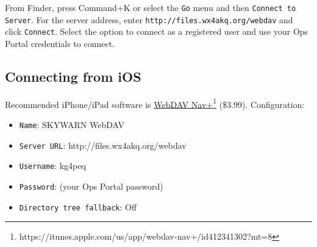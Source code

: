 \documentclass[pdflatex,letterpaper,twoside,12pt]{book}
\begin{document}
From Finder, press Command+K or select the \texttt{Go} menu and then \texttt{Connect to Server}.  For the server address, enter \texttt{http://files.wx4akq.org/webdav} and click \texttt{Connect}.  Select the option to connect as a registered user and use your Ops Portal credentials to connect.

\subsection{Connecting from iOS}

Recommended iPhone/iPad software is \href{https://itunes.apple.com/us/app/webdav-nav+/id412341302?mt=8}{WebDAV Nav+}\footnote{https://itunes.apple.com/us/app/webdav-nav+/id412341302?mt=8} (\$3.99). Configuration:

\begin{itemize}
\item \texttt{Name}: SKYWARN WebDAV
\item \texttt{Server URL}: http://files.wx4akq.org/webdav
\item \texttt{Username}: kg4peq
\item \texttt{Password}: (your Ops Portal password)
\item \texttt{Directory tree fallback}: Off
\end{itemize}







\end{document}
